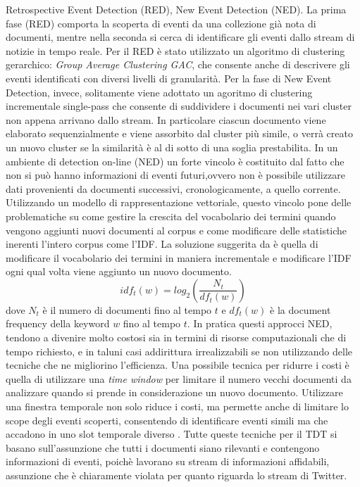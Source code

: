 Retrospective Event Detection (RED), New Event Detection (NED). La prima fase (RED) comporta la scoperta di eventi da una collezione già nota di documenti, mentre nella seconda si cerca di identificare gli eventi dallo stream di notizie in tempo reale. Per il RED è stato utilizzato un algoritmo di clustering gerarchico: \emph{Group Average Clustering GAC}, che consente anche di descrivere gli eventi identificati con diversi livelli di granularità. Per la fase di New Event Detection, invece, solitamente viene adottato un agoritmo di clustering incrementale single-pass \cite{Allan:2002:TDT:772260,Yang:1998:SRO:290941.290953} che consente di suddividere i documenti nei vari cluster non appena arrivano dallo stream. In particolare ciascun documento viene elaborato sequenzialmente e viene assorbito dal cluster più simile, o verrà creato un nuovo cluster se la similarità è al di sotto di una soglia prestabilita. In un ambiente di detection on-line (NED) un forte vincolo è costituito dal fatto che non si può hanno informazioni di eventi futuri,ovvero non è possibile utilizzare dati provenienti da documenti successivi, cronologicamente, a quello corrente. Utilizzando un modello di rappresentazione vettoriale, questo vincolo pone delle problematiche su come gestire la crescita del vocabolario dei termini quando vengono aggiunti nuovi documenti al corpus e come modificare delle statistiche inerenti l'intero corpus come l'IDF. La soluzione suggerita da  \cite{Yang:1998:SRO:290941.290953} è quella di modificare il vocabolario dei termini in maniera incrementale e modificare l'IDF ogni qual volta viene aggiunto un nuovo documento. 
\begin{equation}
\label{eq:incIDF}
idf_t(w)=log_2 \left(\frac{N_t}{df_t(w)} \right) 
\end{equation}
dove $N_t$ è il numero di documenti fino al tempo $t$ e $df_t(w)$ è la document frequency della keyword $w$ fino al tempo $t$.
In pratica questi approcci NED, tendono a divenire molto costosi sia in termini di risorse computazionali che di tempo richiesto, e in taluni casi addirittura irrealizzabili se non utilizzando delle tecniche che ne migliorino l'efficienza. Una possibile tecnica per ridurre i costi è quella di utilizzare una \emph{time window} \cite{Luo:2007:RRN:1247480.1247536,Papka:1999:ONE:897559} per limitare il numero vecchi documenti da analizzare quando si prende in considerazione un nuovo documento. Utilizzare una finestra temporale non solo riduce i costi, ma permette anche di limitare lo scope degli eventi scoperti, consentendo di identificare eventi simili ma che accadono in uno slot temporale diverso \cite{Yang:1998:SRO:290941.290953}. Tutte queste tecniche per il TDT si basano sull'assunzione che tutti i documenti siano rilevanti e contengono informazioni di eventi, poichè lavorano su stream di informazioni affidabili,  assunzione che è chiaramente violata  per quanto riguarda lo stream di Twitter.
